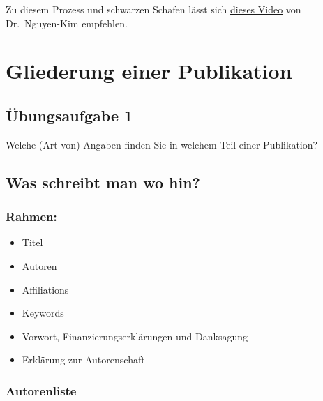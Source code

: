 \documentclass[
]{book}
\begin{document}
Zu diesem Prozess und schwarzen Schafen lässt sich \href{https://www.youtube.com/watch?v=qKQeJM2tZJc}{dieses Video} von Dr.~Nguyen-Kim empfehlen.

\hypertarget{gliederung-einer-publikation}{%
\section{Gliederung einer Publikation}\label{gliederung-einer-publikation}}

\hypertarget{uxfcbungsaufgabe-1}{%
\subsection{Übungsaufgabe 1}\label{uxfcbungsaufgabe-1}}

Welche (Art von) Angaben finden Sie in welchem Teil einer Publikation?

\hypertarget{was-schreibt-man-wo-hin}{%
\subsection{Was schreibt man wo hin?}\label{was-schreibt-man-wo-hin}}

\hypertarget{rahmen}{%
\subsubsection{Rahmen:}\label{rahmen}}

\begin{itemize}
\item
  Titel
\item
  Autoren
\item
  Affiliations
\item
  Keywords
\item
  Vorwort, Finanzierungserklärungen und Danksagung
\item
  Erklärung zur Autorenschaft
\end{itemize}

\hypertarget{autorenliste}{%
\subsubsection{Autorenliste}\label{autorenliste}}
\end{document}

